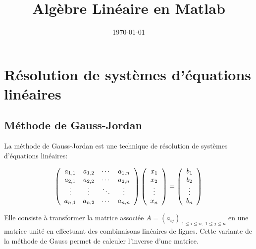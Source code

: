 \documentclass[a4paper, 10pt]{article}
\begin{document}
\title{Algèbre Linéaire en Matlab}

\date{\today}
 
\maketitle


\section{Résolution de systèmes d'équations linéaires}

\subsection{Méthode de Gauss-Jordan}

La méthode de Gauss-Jordan est une technique de résolution de systèmes d'équations linéaires:

\begin{equation}
\left(
\begin{array}{c c c c}
a_{1,1}   & a_{1,2}   & \cdots & a_{1,n} \\
a_{2,1}   & a_{2,2}   & \cdots & a_{2,n} \\
\vdots         & \vdots         & \ddots & \vdots \\
a_{n,1} & a_{n,2} & \cdots & a_{n,n} 
\end{array}
\right)
\left(
\begin{array}{c}
x_1 \\ x_2 \\ \vdots \\ x_{n}
\end{array}
\right)
=
\left(
\begin{array}{c}
b_1 \\ b_2 \\ \vdots \\ b_{n}
\end{array}
\right)
\end{equation}


Elle consiste à transformer la matrice associée $A=(a_{ij})_{\; 1\leq i \leq n,\;  1\leq j \leq n }$ en une matrice unité en effectuant des combinaisons linéaires de lignes.
Cette variante de la méthode de Gauss permet de calculer l'inverse d'une matrice.
\end{document}
